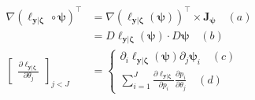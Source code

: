 \documentclass[long, final]{jobim}
\begin{document}
\begin{equation}
\label{eq:chain-rule-first-order}
\begin{aligned}
  \nabla \left(\ell_{\boldsymbol{y} | \boldsymbol{\zeta}} \, \circ \boldsymbol{\psi}\right)^\top &=
    \nabla \left(\ell_{\boldsymbol{y} | \boldsymbol{\zeta}} (\boldsymbol{\psi}) \right)^\top \times \mathbf{J}_{\boldsymbol{\psi}}  \quad (a)\\
    &=   D \ell_{\boldsymbol{y} | \boldsymbol{\zeta}} (\boldsymbol{\psi}) \cdot D \boldsymbol{\psi} \quad (b) \\
\begin{bmatrix}
\frac{\partial \ell_{\boldsymbol{y} | \boldsymbol{\zeta}}}{\partial \theta_j}
\end{bmatrix}_{j < J}
  &=
\begin{cases}
\partial_i \ell_{\boldsymbol{y} | \boldsymbol{\zeta}} (\boldsymbol{\psi}) \partial_j \boldsymbol{\psi}_i \quad (c) \\
\sum_{i=1}^J \frac{\partial \ell_{\boldsymbol{y} | \boldsymbol{\zeta}}}{\partial p_i} \frac{\partial p_i}{\partial \theta_j} \quad (d)
\end{cases}
 \end{aligned}
\end{equation}
\end{document}
